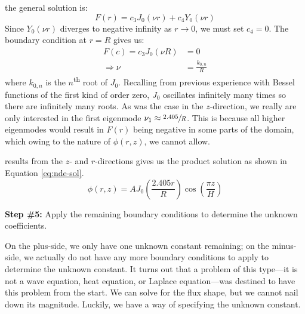  the general solution is:
\begin{equation*}
F(r) = c_3J_0(\nu r) + c_4Y_0(\nu r)
\end{equation*}
Since $Y_0(\nu r)$ diverges to negative infinity as $r \to 0$, we must set $c_4 = 0$. The boundary condition at $r=R$ gives us:
\begin{align*}
F(c) = c_3 J_0(\nu R) &= 0 \\
\Rightarrow \nu &= \frac{k_{0,n}}{R}
\end{align*}
where $k_{0,n}$ is the $n$\textsuperscript{th} root of $J_0$.  Recalling from previous experience with Bessel functions of the first kind of order zero, $J_0$ oscillates infinitely many times so there are infinitely many roots.  As was the case in the $z$-direction, we really are only interested in the first eigenmode $\nu_1 \approx \sfrac{2.405}{R}$.  This is because all higher eigenmodes would result in $F(r)$ being negative in some parts of the domain, which owing to the nature of $\phi(r,z)$, we cannot allow.

 results from the $z$- and $r$-directions gives us the product solution as shown in Equation \ref{eq:nde-sol}.
\begin{equation}
\phi(r,z) = A J_0(\frac{2.405 r}{R})\cos{(\frac{\pi z}{H})}
\label{eq:nde-sol}
\end{equation}

\vspace{0.25cm}

\noindent\textbf{Step \#5:} Apply the remaining boundary conditions to determine the unknown coefficients.

\vspace{0.25cm}

\noindent On the plus-side, we only have one unknown constant remaining; on the minus-side, we actually do not have any more boundary conditions to apply to determine the unknown constant.  It turns out that a problem of this type---it is not a wave equation, heat equation, or Laplace equation---was destined to have this problem from the start.  We can solve for the flux shape, but we cannot nail down its magnitude.  Luckily, we have a way of specifying the unknown constant.

